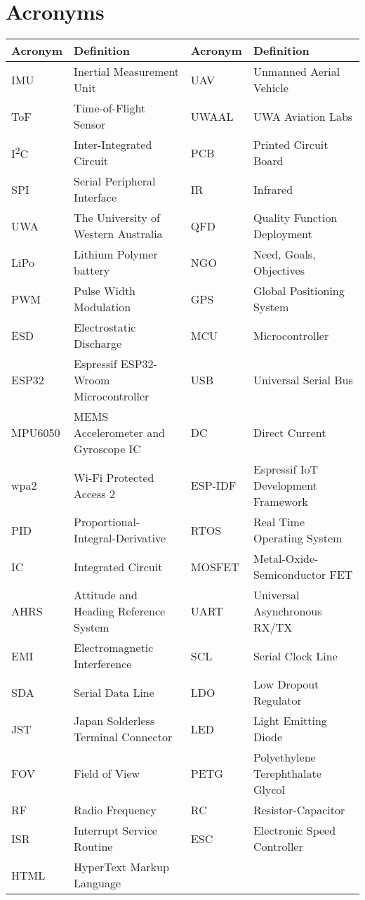 
\section*{Acronyms}
\renewcommand{\arraystretch}{1.2} %

\begin{tabular}{p{} p{} | p{} p{}}
\textbf{Acronym} & \textbf{Definition} & \textbf{Acronym} & \textbf{Definition} \\
\hline
IMU & Inertial Measurement Unit & UAV & Unmanned Aerial Vehicle \\
ToF & Time-of-Flight Sensor & UWAAL & UWA Aviation Labs \\
I\textsuperscript{2}C & Inter-Integrated Circuit & PCB & Printed Circuit Board \\
SPI & Serial Peripheral Interface & IR & Infrared \\
UWA & The University of Western Australia & QFD & Quality Function Deployment \\
LiPo & Lithium Polymer battery & NGO & Need, Goals, Objectives \\
PWM & Pulse Width Modulation & GPS & Global Positioning System \\
ESD & Electrostatic Discharge & MCU & Microcontroller \\
ESP32 & Espressif ESP32-Wroom Microcontroller & USB & Universal Serial Bus \\
MPU6050 & MEMS Accelerometer and Gyroscope IC & DC & Direct Current \\
wpa2 & Wi-Fi Protected Access 2 & ESP-IDF & Espressif IoT Development Framework \\
PID & Proportional-Integral-Derivative & RTOS & Real Time Operating System \\
IC & Integrated Circuit & MOSFET & Metal-Oxide-Semiconductor FET \\
AHRS & Attitude and Heading Reference System & UART & Universal Asynchronous RX/TX \\
EMI & Electromagnetic Interference & SCL & Serial Clock Line \\
SDA & Serial Data Line & LDO & Low Dropout Regulator \\
JST & Japan Solderless Terminal Connector & LED & Light Emitting Diode \\
FOV & Field of View & PETG & Polyethylene Terephthalate Glycol \\
RF & Radio Frequency & RC & Resistor-Capacitor \\
ISR & Interrupt Service Routine & ESC & Electronic Speed Controller \\
HTML & HyperText Markup Language &  &  \\
\end{tabular}
